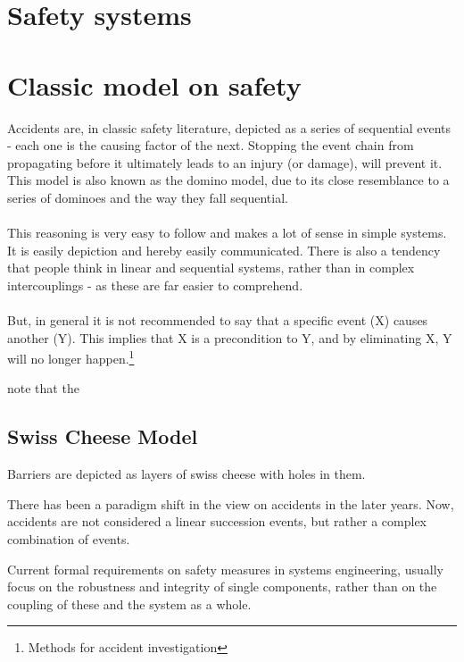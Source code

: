 \section{Safety systems}

\section{Classic model on safety}
Accidents are, in classic safety literature, depicted as a series of sequential events - each one is the causing factor of the next. Stopping the event chain from propagating before it ultimately leads to an injury (or damage), will prevent it. This model is also known as the domino model, due to its close resemblance to a series of dominoes and the way they fall sequential.\\
\\
This reasoning is very easy to follow and makes a lot of sense in simple systems. It is easily depiction and hereby easily communicated. There is also a tendency that people think in linear and sequential systems, rather than in complex intercouplings - as these are far easier to comprehend.\\
\\
But, in general it is not recommended to say that a specific event (X) causes another (Y). This implies that X is a precondition to Y, and by eliminating X, Y will no longer happen.\footnote{Methods for accident investigation}

\cite{hollnagel2004barriers} note that the 
\subsection{Swiss Cheese Model}

Barriers are depicted as layers of swiss cheese with holes in them. 


There has been a paradigm shift in the view on accidents in the later years. Now, accidents are not considered a linear succession events, but rather a complex combination of events.




Current formal requirements on safety measures in systems engineering, usually focus on the robustness and integrity of single components, rather than on the coupling of these and the system as a whole.
